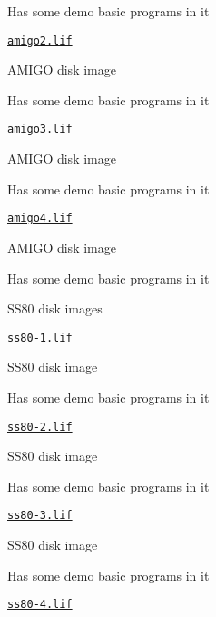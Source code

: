 \begin{DoxyItemize}
\begin{DoxyItemize}
\begin{DoxyItemize}
\begin{DoxyItemize}
\begin{DoxyItemize}
\item Has some demo basic programs in it
\end{DoxyItemize}
\item \href{sdcard/amigo1.lif}{\tt amigo2.\+lif}
\begin{DoxyItemize}
\item A\+M\+I\+GO disk image
\item Has some demo basic programs in it
\end{DoxyItemize}
\item \href{sdcard/amigo2.lif}{\tt amigo3.\+lif}
\begin{DoxyItemize}
\item A\+M\+I\+GO disk image
\item Has some demo basic programs in it
\end{DoxyItemize}
\item \href{sdcard/amigo3.lif}{\tt amigo4.\+lif}
\begin{DoxyItemize}
\item A\+M\+I\+GO disk image
\item Has some demo basic programs in it
\end{DoxyItemize}
\end{DoxyItemize}
\item S\+S80 disk images
\begin{DoxyItemize}
\item \href{sdcard/ss80-0.lif}{\tt ss80-\/1.\+lif}
\begin{DoxyItemize}
\item S\+S80 disk image
\item Has some demo basic programs in it
\end{DoxyItemize}
\item \href{sdcard/ss80-1.lif}{\tt ss80-\/2.\+lif}
\begin{DoxyItemize}
\item S\+S80 disk image
\item Has some demo basic programs in it
\end{DoxyItemize}
\item \href{sdcard/ss80-2.lif}{\tt ss80-\/3.\+lif}
\begin{DoxyItemize}
\item S\+S80 disk image
\item Has some demo basic programs in it
\end{DoxyItemize}
\item \href{sdcard/ss80-3.lif}{\tt ss80-\/4.\+lif}
\begin{DoxyItemize}

\end{DoxyItemize}
\end{DoxyItemize}
\end{DoxyItemize}
\end{DoxyItemize}
\end{DoxyItemize}
